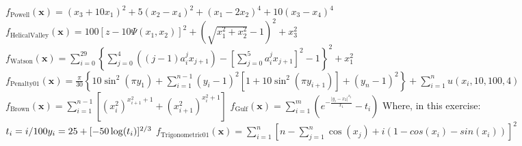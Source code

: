 \documentclass[]{article}
\title{}
\author{}
\begin{document}
\maketitle

$
f_{\text{Powell}}(\mathbf{x}) = (x_3+10x_1)^2+5(x_2-x_4)^2+(x_1-2x_2)^4+10(x_3-x_4)^4
$
$
f_{\text{HelicalValley}}(\mathbf{x}) = 100{[z-10\Psi(x_1,x_2)]^2+(\sqrt{x_1^2+x_2^2}-1)^2}+x_3^2
$
$
f_{\text{Watson}}(\mathbf{x}) = \sum_{i=0}^{29} \left\{ \sum_{j=0}^4 ((j - 1)a_i^j x_{j+1}) - \left[ \sum_{j=0}^5 a_i^j x_{j+1} \right ]^2 - 1 \right\}^2 + x_1^2
$
$
f_{\text{Penalty01}}(\mathbf{x}) = \frac{\pi}{30} \left\{10 \sin^2(\pi y_1) + \sum_{i=1}^{n-1} (y_i - 1)^2 \left[1 + 10 \sin^2(\pi y_{i+1}) \right ] + (y_n - 1)^2 \right \} + \sum_{i=1}^n u(x_i, 10, 100, 4)
$
$
f_{\text{Brown}}(\mathbf{x}) = \sum_{i=1}^{n-1}\left[ \left(x_i^2\right)^{x_{i+1}^2+1} + \left(x_{i+1}^2\right)^{x_i^2+1} \right]
$
$
f_{\text{Gulf}}(\mathbf{x}) = \sum_{i=1}^m \left( e^{-\frac{\lvert y_i - x_2 \rvert^{x_3}}{x_1}    }  - t_i \right)
$
Where, in this exercise:
$
t_i = i/100 \\
y_i = 25 + [-50 \log(t_i)]^{2/3}
$
$
f_{\text{Trigonometric01}}(\mathbf{x}) = \sum_{i=1}^{n} \left [n - \sum_{j=1}^{n} \cos(x_j) + i \left(1 - cos(x_i) - sin(x_i) \right ) \right]^2
$
\end{document}
